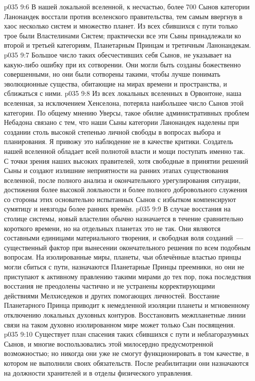 \vs p035 9:6 В нашей локальной вселенной, к несчастью, более 700 Сынов категории Ланонандек восстали против вселенского правительства, тем самым ввергнув в хаос несколько систем и множество планет. Из всех сбившихся с пути только трое были Властелинами Систем; практически все эти Сыны принадлежали ко второй и третьей категориям, Планетарным Принцам и третичным Ланонандекам.
\vs p035 9:7 Большое число таких обесчестивших себя Сынов, не указывает на какую\hyp{}либо ошибку при их сотворении. Они могли быть созданы божественно совершенными, но они были сотворены такими, чтобы лучше понимать эволюционные существа, обитающие на мирах времени и пространства, и сближаться с ними.
\vs p035 9:8 Из всех локальных вселенных в Орвонтоне, наша вселенная, за исключением Хенселона, потеряла наибольшее число Сынов этой категории. По общему мнению Уверсы, такое обилие административных проблем Небадона связано с тем, что наши Сыны категории Ланонандек наделены при создании столь высокой степенью личной свободы в вопросах выбора и планирования. Я привожу это наблюдение не в качестве критики. Создатель нашей вселенной обладает всей полнотой власти и мощи поступать именно так. С точки зрения наших высоких правителей, хотя свободные в принятии решений Сыны и создают излишние неприятности на ранних этапах существования вселенной, после полного анализа и окончательного урегулирования ситуации, достижения более высокой лояльности и более полного добровольного служения со стороны этих основательно испытанных Сынов с избытком компенсируют сумятицу и невзгоды более ранних времён.
\vs p035 9:9 \pc В случае восстания на столице системы, новый властелин обычно назначается в течение сравнительно короткого времени, но на отдельных планетах это не так. Они являются составными единицами материального творения, и свободная воля созданий~--- существенный фактор при вынесении окончательного решения по всем подобным вопросам. На изолированные миры, планеты, чьи облечённые властью принцы могли сбиться с пути, назначаются Планетарные Принцы преемники, но они не приступают к активному правлению такими мирами до тех пор, пока последствия восстания не преодолены частично и не устранены корректирующими действиями Мелхиседеков и других помогающих личностей. Восстание Планетарного Принца приводит к немедленной изоляции планеты и мгновенному отключению локальных духовных контуров. Восстановить межпланетные линии связи на таком духовно изолированном мире может только Сын посвящения.
\vs p035 9:10 Существует план спасения таких сбившихся с пути и неблагоразумных Сынов, и многие воспользовались этой милосердно предусмотренной возможностью; но никогда они уже не смогут функционировать в том качестве, в котором не выполнили своих обязательств. После реабилитации они назначаются на должности хранителей и в отделы физического управления.
